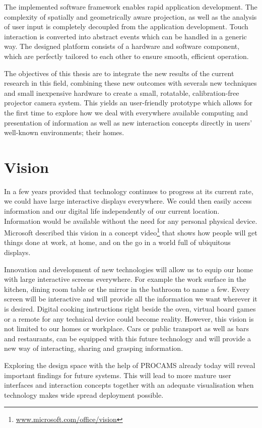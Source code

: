The implemented software framework enables rapid application development. The complexity of spatially and geometrically aware projection, as well as the analysis of user input is completely decoupled from the application development. Touch interaction is converted into abstract events which can be handled in a generic way. 
The designed platform consists of a hardware and software component, which are perfectly tailored to each other to ensure smooth, efficient operation.

The objectives of this thesis are to integrate the new results of the current research in this field, combining these	 new outcomes with severals new techniques and small inexpensive hardware to create a small, rotatable, calibration-free projector camera system. This yields an user-friendly prototype which allows for the first time to explore how we deal with everywhere available computing and presentation of information as well as  new interaction concepts directly in users' well-known environments; their homes.


\section{Vision}
In a few years provided that technology continues to progress at its current rate, we could have large interactive displays everywhere. We could then easily access information and our digital life independently of our current location. Information would be available without the need for any personal physical device. Microsoft described this vision in a concept video\footnote{\url{www.microsoft.com/office/vision}} that shows how people will get things done at work, at home, and on the go in a world full of ubiquitous displays. 

Innovation and development of new technologies will allow us to equip our home with large interactive screens everywhere. For example the work surface in the kitchen, dining room table or the mirror in the bathroom to name a few. Every screen will be interactive and will provide all the information we want wherever it is desired. Digital cooking instructions right beside the oven, virtual board games or a remote for any technical device could become reality. However, this vision is not limited to our homes or workplace. Cars or public transport as well as bars and restaurants, can be equipped with this future technology and will provide a new way of interacting, sharing and grasping information.

Exploring the design space with the help of PROCAMS already today will reveal important findings for future systems. This will lead to more mature user interfaces and interaction concepts together with an adequate visualisation when technology makes wide spread deployment possible.


